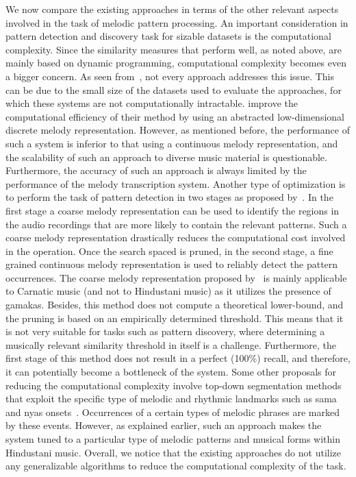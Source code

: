 We now compare the existing approaches in terms of the other relevant aspects involved in the task of melodic pattern processing. An important consideration in pattern detection and discovery task for sizable datasets is the computational complexity. Since the similarity measures that perform well, as noted above, are mainly based on dynamic programming, computational complexity becomes even a bigger concern. As seen from~, not every approach addresses this issue. This can be due to the small size of the datasets used to evaluate the approaches, for which these systems are not computationally intractable. \cite{ganguli2015efficient} improve the computational efficiency of their method by using an abstracted low-dimensional discrete melody representation. However, as mentioned before, the performance of such a system is inferior to that using a continuous melody representation, and the scalability of such an approach to diverse music material is questionable. Furthermore, the accuracy of such an approach is always limited by the performance of the melody transcription system. Another type of optimization is to perform the task of pattern detection in two stages as proposed by~\cite{dutta2014modified,Ishwar2013}. In the first stage a coarse melody representation can be used to identify the regions in the audio recordings that are more likely to contain the relevant patterns. Such a coarse melody representation drastically reduces the computational cost involved in the operation. Once the search spaced is pruned, in the second stage, a fine grained continuous melody representation is used to reliably detect the pattern occurrences. The coarse melody representation proposed by~\cite{Ishwar2013} is mainly applicable to Carnatic music (and not to Hindustani music) as it utilizes the presence of \glspl{gamaka}. Besides, this method does not compute a theoretical lower-bound, and the pruning is based on an empirically determined threshold. This means that it is not very suitable for tasks such as pattern discovery, where determining a musically relevant similarity threshold in itself is a challenge. Furthermore, the first stage of this method does not result in a perfect (100\%) recall, and therefore, it can potentially become a bottleneck of the system. Some other proposals for reducing the computational complexity involve top-down segmentation methods that exploit the specific type of melodic and rhythmic landmarks such as \gls{sama} and \gls{nyas} onsets~\citep{Ross2012,Ross2012b}. Occurrences of a certain types of melodic phrases are marked by these events. However, as explained earlier, such an approach makes the system tuned to a particular type of melodic patterns and musical forms within Hindustani music. Overall, we notice that the existing approaches do not utilize any generalizable algorithms to reduce the computational complexity of the task. 

